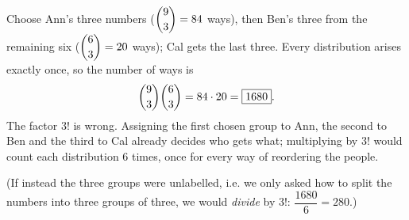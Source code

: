 Choose Ann's three numbers ($\dbinom93=84$ ways), then Ben's three from the remaining six ($\dbinom63=20$ ways); Cal gets the last three. Every distribution arises exactly once, so the number of ways is
\[\dbinom93\dbinom63=84\cdot20=\boxed{1680}.\]
The factor $3!$ is wrong. Assigning the first chosen group to Ann, the second to Ben and the third to Cal already decides who gets what; multiplying by $3!$ would count each distribution $6$ times, once for every way of reordering the people.

(If instead the three groups were unlabelled, i.e. we only asked how to split the numbers into three groups of three, we would \emph{divide} by $3!$: $\dfrac{1680}{6}=280$.)
